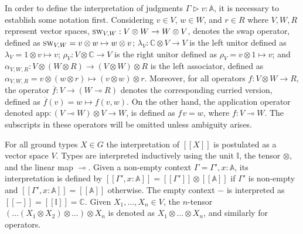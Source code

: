 In order to define the interpretation of judgments $\Gamma \triangleright v: \mathbb{A}$, it is necessary to establish some notation first. Considering $v \in V$, $w \in W$, and $r \in R$  where $V, W, R$ represent vector spaces,  $\textsc{sw}_{V,W} : V\otimes W \xrightarrow{} W \otimes V$, denotes the swap operator, defined as $\textsc{sw}_{V,W}= v\otimes w \mapsto w \otimes v$;    $\lambda_{V} : \mathbb{C} \otimes V \xrightarrow{} V $ is the left unitor defined as $\lambda_{V}= 1 \otimes v \mapsto v $; $\rho_{V} : V  \otimes \mathbb{C} \xrightarrow{} V $ is the right unitor defined as $\rho_{V}= v \otimes 1 \mapsto v$; and $\alpha_{V,W,R} : V  \otimes (W \otimes R) \xrightarrow{} (V  \otimes W) \otimes R$ is the left associator, defined as $\alpha_{V,W,R}= v \otimes (w \otimes r) \mapsto (v \otimes w) \otimes r $. Moreover, for all operators $f: V \otimes W \xrightarrow{} R$, the operator $\overline{f} : V \xrightarrow{} (W \multimap R)$ denotes the corresponding curried version, defined as $\overline{f}(v) = w \mapsto  f(v,w)$. On the other hand, the application operator denoted $\text{app}: (V \multimap W) \otimes V \rightarrow W$, is defined as $f\hspace{1pt} v = w $, where $f: V \multimap W $.   The subscripts in these operators will be omitted unless ambiguity arises. 

For all ground types $X \in G$  the interpretation of $[\![X]\!]$  is postulated as a vector space $V$. Types are interpreted inductively using the unit $\mathbb{I}$, the tensor $\otimes$, and the linear map $\multimap$. Given a non-empty context $\Gamma=\Gamma',x: \mathbb{A}$, its interpretation is defined by $[\![\Gamma',x: \mathbb{A}]\!] = [\![\Gamma']\!] \otimes [\![\mathbb{A}]\!]$ if $\Gamma'$ is non-empty and $[\![\Gamma',x: \mathbb{A}]\!] = [\![\mathbb{A}]\!]$ otherwise. The empty context $-$ is interpreted as $[\![-]\!] = [\![ \mathbb{I}]\!] = \mathbb{C}$. Given $X_{1}, . . . ,X_{n} \in V$, the $n$-tensor $(\ldots (X_1 \otimes X_2) \otimes \ldots ) \otimes X_{n}$ is denoted as $X_1 \otimes \ldots \otimes X_{n}$, and similarly for operators. 


